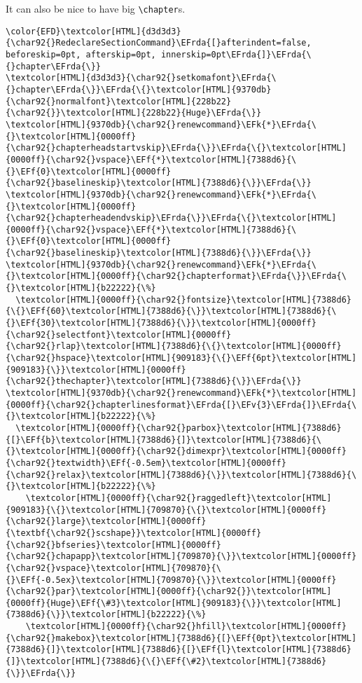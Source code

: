 \documentclass{article}
\newcommand{\EFk}[1]{\textcolor{EFk}{#1}} %
\newcommand{\EFf}[1]{\textcolor{EFf}{#1}} %
\newcommand{\EFv}[1]{\textcolor{EFv}{#1}} %
\newcommand{\EFrda}[1]{\textcolor{EFrda}{#1}} %
\begin{document}
It can also be nice to have big \texttt{\textbackslash{}chapter}​s.
\begin{Code}
\begin{Verbatim}
\color{EFD}\textcolor[HTML]{d3d3d3}{\char92{}RedeclareSectionCommand}\EFrda{[}afterindent=false, beforeskip=0pt, afterskip=0pt, innerskip=0pt\EFrda{]}\EFrda{\{}chapter\EFrda{\}}
\textcolor[HTML]{d3d3d3}{\char92{}setkomafont}\EFrda{\{}chapter\EFrda{\}}\EFrda{\{}\textcolor[HTML]{9370db}{\char92{}normalfont}\textcolor[HTML]{228b22}{\char92{}}\textcolor[HTML]{228b22}{Huge}\EFrda{\}}
\textcolor[HTML]{9370db}{\char92{}renewcommand}\EFk{*}\EFrda{\{}\textcolor[HTML]{0000ff}{\char92{}chapterheadstartvskip}\EFrda{\}}\EFrda{\{}\textcolor[HTML]{0000ff}{\char92{}vspace}\EFf{*}\textcolor[HTML]{7388d6}{\{}\EFf{0}\textcolor[HTML]{0000ff}{\char92{}baselineskip}\textcolor[HTML]{7388d6}{\}}\EFrda{\}}
\textcolor[HTML]{9370db}{\char92{}renewcommand}\EFk{*}\EFrda{\{}\textcolor[HTML]{0000ff}{\char92{}chapterheadendvskip}\EFrda{\}}\EFrda{\{}\textcolor[HTML]{0000ff}{\char92{}vspace}\EFf{*}\textcolor[HTML]{7388d6}{\{}\EFf{0}\textcolor[HTML]{0000ff}{\char92{}baselineskip}\textcolor[HTML]{7388d6}{\}}\EFrda{\}}
\textcolor[HTML]{9370db}{\char92{}renewcommand}\EFk{*}\EFrda{\{}\textcolor[HTML]{0000ff}{\char92{}chapterformat}\EFrda{\}}\EFrda{\{}\textcolor[HTML]{b22222}{\%}
  \textcolor[HTML]{0000ff}{\char92{}fontsize}\textcolor[HTML]{7388d6}{\{}\EFf{60}\textcolor[HTML]{7388d6}{\}}\textcolor[HTML]{7388d6}{\{}\EFf{30}\textcolor[HTML]{7388d6}{\}}\textcolor[HTML]{0000ff}{\char92{}selectfont}\textcolor[HTML]{0000ff}{\char92{}rlap}\textcolor[HTML]{7388d6}{\{}\textcolor[HTML]{0000ff}{\char92{}hspace}\textcolor[HTML]{909183}{\{}\EFf{6pt}\textcolor[HTML]{909183}{\}}\textcolor[HTML]{0000ff}{\char92{}thechapter}\textcolor[HTML]{7388d6}{\}}\EFrda{\}}
\textcolor[HTML]{9370db}{\char92{}renewcommand}\EFk{*}\textcolor[HTML]{0000ff}{\char92{}chapterlinesformat}\EFrda{[}\EFv{3}\EFrda{]}\EFrda{\{}\textcolor[HTML]{b22222}{\%}
  \textcolor[HTML]{0000ff}{\char92{}parbox}\textcolor[HTML]{7388d6}{[}\EFf{b}\textcolor[HTML]{7388d6}{]}\textcolor[HTML]{7388d6}{\{}\textcolor[HTML]{0000ff}{\char92{}dimexpr}\textcolor[HTML]{0000ff}{\char92{}textwidth}\EFf{-0.5em}\textcolor[HTML]{0000ff}{\char92{}relax}\textcolor[HTML]{7388d6}{\}}\textcolor[HTML]{7388d6}{\{}\textcolor[HTML]{b22222}{\%}
    \textcolor[HTML]{0000ff}{\char92{}raggedleft}\textcolor[HTML]{909183}{\{}\textcolor[HTML]{709870}{\{}\textcolor[HTML]{0000ff}{\char92{}large}\textcolor[HTML]{0000ff}{\textbf{\char92{}scshape}}\textcolor[HTML]{0000ff}{\char92{}bfseries}\textcolor[HTML]{0000ff}{\char92{}chapapp}\textcolor[HTML]{709870}{\}}\textcolor[HTML]{0000ff}{\char92{}vspace}\textcolor[HTML]{709870}{\{}\EFf{-0.5ex}\textcolor[HTML]{709870}{\}}\textcolor[HTML]{0000ff}{\char92{}par}\textcolor[HTML]{0000ff}{\char92{}}\textcolor[HTML]{0000ff}{Huge}\EFf{\#3}\textcolor[HTML]{909183}{\}}\textcolor[HTML]{7388d6}{\}}\textcolor[HTML]{b22222}{\%}
    \textcolor[HTML]{0000ff}{\char92{}hfill}\textcolor[HTML]{0000ff}{\char92{}makebox}\textcolor[HTML]{7388d6}{[}\EFf{0pt}\textcolor[HTML]{7388d6}{]}\textcolor[HTML]{7388d6}{[}\EFf{l}\textcolor[HTML]{7388d6}{]}\textcolor[HTML]{7388d6}{\{}\EFf{\#2}\textcolor[HTML]{7388d6}{\}}\EFrda{\}}
\end{Verbatim}
\end{Code}
\end{document}
